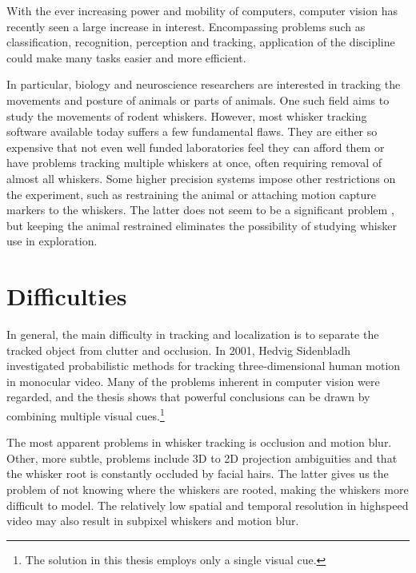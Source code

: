 With the ever increasing power and mobility of computers, computer
vision has recently seen a large increase in interest.  Encompassing
problems such as classification, recognition, perception and tracking,
application of the discipline could make many tasks easier and more
efficient.

In particular, biology and neuroscience researchers are interested in
tracking the movements and posture \cite{WhiskerVideography} of
animals or parts of animals.  One such field aims to study the
movements of rodent whiskers. However, most whisker tracking software
available today suffers a few fundamental flaws.  They are either so
expensive that not even well funded laboratories feel they can afford
them or have problems tracking multiple whiskers at once, often
requiring removal of almost all whiskers.  Some higher precision
systems impose other restrictions on the experiment, such as
restraining the animal or attaching motion capture markers to the
whiskers. The latter does not seem to be a significant problem
\cite{BadExample1}, but keeping the animal restrained eliminates the
possibility of studying whisker use in exploration.

\section{Difficulties}
In general, the main difficulty in tracking and localization is to
separate the tracked object from clutter and occlusion. In 2001,
Hedvig Sidenbladh investigated probabilistic methods for tracking
three-dimensional human motion in monocular video. \cite{Hedvig} Many
of the problems inherent in computer vision were regarded, and the
thesis shows that powerful conclusions can be drawn by combining
multiple visual cues.\footnote{The solution in this thesis employs
  only a single visual cue.}

The most apparent problems in whisker tracking is occlusion and motion
blur. Other, more subtle, problems include 3D to 2D projection
ambiguities and that the whisker root is constantly occluded by facial
hairs. The latter gives us the problem of not knowing where the
whiskers are rooted, making the whiskers more difficult to model. The
relatively low spatial and temporal resolution in highspeed video may
also result in subpixel whiskers and motion
blur.\cite{WhiskerVideography}



